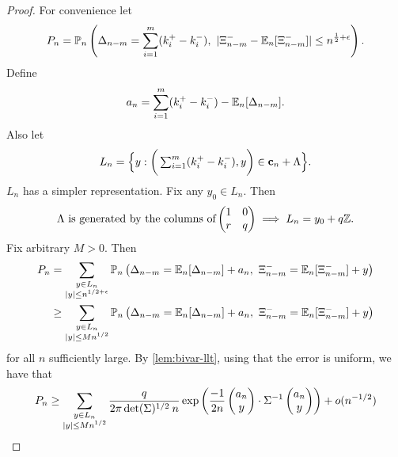 \begin{proof}
    For convenience let
    \begin{equation*}
        P_n = \mathbb P_n \left(
            \Delta_{n-m} = \sum_{i=1}^m (k_i^+ - k_i^-), \ 
            \abs{\Xi^-_{n-m} - \E_n[\Xi^-_{n-m}]} \leq n^{\frac{1}{2} + \epsilon}
        \right).
    \end{equation*}
    Define
    \begin{equation*}
        a_n = \sum_{i=1}^m (k_i^+ - k_i^-) - {\mathbb E}_n[\Delta_{n-m}].
    \end{equation*}
    Also let
    \begin{equation*}
        L_n = \Big\{
            y : \bigg( \textstyle\sum_{i=1}^m (k_i^+ - k_i^-), y \bigg) \in {\mathbf c}_n + \Lambda
            \Big\}.
    \end{equation*}
    $L_n$ has a simpler representation. Fix any $y_0 \in L_n$. Then
    \begin{equation*}
        \text{$\Lambda$ is generated by the columns of} \begin{pmatrix}
            1 & 0 \\
            r & q
        \end{pmatrix}
        \implies L_n = y_0 + q {\mathbb Z}.
    \end{equation*}
    Fix arbitrary $M > 0$. Then
    \begin{align*}
        P_n &= \sum_{\substack{y \in L_n \\ \abs{y} \leq n^{1/2 + \epsilon}}} \mathbb P_n \left( \Delta_{n-m} = \E_n[\Delta_{n-m}] + a_n, \ \Xi^-_{n-m} = \E_n[\Xi^-_{n-m}] + y \right) \\
        &\geq \sum_{\substack{y \in L_n \\ \abs{y} \leq M n^{1/2}}} \mathbb P_n \left( \Delta_{n-m} = \E_n[\Delta_{n-m}] + a_n, \ \Xi^-_{n-m} = \E_n[\Xi^-_{n-m}] + y \right)
    \end{align*}
    for all $n$ sufficiently large. By \cref{lem:bivar-llt}, using that the error is uniform, we have that
    \begin{equation*}
        P_n \geq \sum_{\substack{y \in L_n \\ \lvert y\rvert \leq M n^{1/2}}} 
         \frac{q}{2\pi \det(\Sigma)^{1/2} \: n} \exp\left( 
            \frac{-1}{2n} \begin{pmatrix} a_n \\ y \end{pmatrix} \cdot \Sigma^{-1} \begin{pmatrix} a_n \\ y \end{pmatrix}
         \right)
         + o( n^{-1/2} )
    \end{equation*}


\end{proof}
